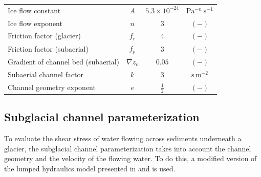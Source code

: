 \documentclass[11pt]{article}
\newcommand{\alpine}{\textit{ALPINE}\,}
\newcommand{\icesheet}{\textit{ICESHEET}\,}
\newcommand{\unit}[1]{$\mathrm{#1}$}
\begin{document}
\begin{table}[ht]
\begin{tabular}{ l  c  c c }
    Ice flow constant &$A$& $5.3\times10^{-24}$ &\unit{Pa}$^{-n}$\,$s^{-1}$\\
    Ice flow exponent &$n$& $3$ &$\mathrm{(-)}$\\
    Friction factor (glacier) & $f_r$ & $4$ & $\mathrm{(-)}$ \\
    Friction factor (subaerial) & $f_p$ & $3$ & $\mathrm{(-)}$\\
    Gradient of channel bed (subaerial) &$\nabla z_c$ &$0.05$& $\mathrm{(-)}$\\
    Subaerial channel factor & $k$ &$3$ & $\mathrm{s\,m^{-2}}$\\
    Channel geometry exponent &$e$& $\frac{1}{2}$&$\mathrm{(-)}$ \\
    \hline
  \end{tabular}
  \label{table:vpm}


  

\end{table}

\subsection{Subglacial channel  parameterization}
\label{sect:sub_mode}

To evaluate the shear stress of water flowing across sediments underneath a glacier, the subglacial channel parameterization takes into account the channel geometry and the velocity of the flowing water.
To do this, a modified version of  the lumped hydraulics model presented in \citet{clarke1996} and \citet{werder2010} is used.
\end{document}
